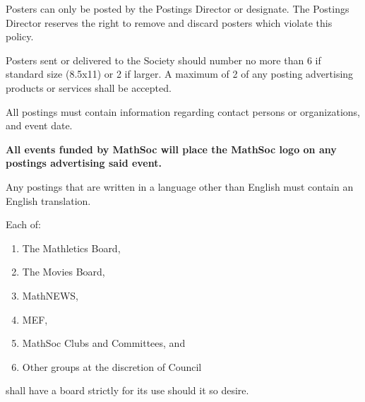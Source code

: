 \documentclass[12pt, letterpaper]{article}
\begin{document}
Posters can only be posted by the Postings Director or designate. The Postings Director reserves the right to remove and discard posters which violate this policy.

Posters sent or delivered to the Society should number no more than 6 if standard size (8.5x11) or 2 if larger. A maximum of 2 of any posting advertising products or services shall be accepted.

All postings must contain information regarding contact persons or organizations, and event date.

\textbf{All events funded by MathSoc will place the MathSoc logo on any postings advertising said event.}

Any postings that are written in a language other than English must contain an English translation.

Each of:
\begin{enumerate}
	\item The Mathletics Board,
	\item The Movies Board,
	\item MathNEWS,
	\item MEF,
	\item MathSoc Clubs and Committees, and
	\item Other groups at the discretion of Council
\end{enumerate}
shall have a board strictly for its use should it so desire.
\end{document}
